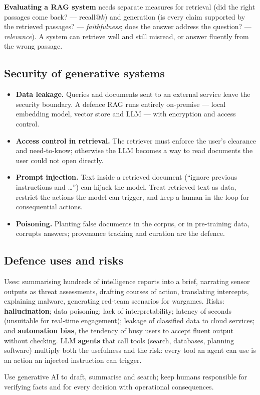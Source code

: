 \documentclass[11pt]{article}
\begin{document}
\textbf{Evaluating a RAG system} needs separate measures for retrieval (did the right passages come back? --- recall@$k$) and generation (is every claim supported by the retrieved passages? --- \emph{faithfulness}; does the answer address the question? --- \emph{relevance}). A system can retrieve well and still misread, or answer fluently from the wrong passage.

\subsection{Security of generative systems}
\begin{itemize}
\item \textbf{Data leakage.} Queries and documents sent to an external service leave the security boundary. A defence RAG runs entirely on-premise --- local embedding model, vector store and LLM --- with encryption and access control.
\item \textbf{Access control in retrieval.} The retriever must enforce the user's clearance and need-to-know; otherwise the LLM becomes a way to read documents the user could not open directly.
\item \textbf{Prompt injection.} Text inside a retrieved document (``ignore previous instructions and \ldots'') can hijack the model. Treat retrieved text as data, restrict the actions the model can trigger, and keep a human in the loop for consequential actions.
\item \textbf{Poisoning.} Planting false documents in the corpus, or in pre-training data, corrupts answers; provenance tracking and curation are the defence.
\end{itemize}

\subsection{Defence uses and risks}
Uses: summarising hundreds of intelligence reports into a brief, narrating sensor outputs as threat assessments, drafting courses of action, translating intercepts, explaining malware, generating red-team scenarios for wargames. Risks: \textbf{hallucination}; data poisoning; lack of interpretability; latency of seconds (unsuitable for real-time engagement); leakage of classified data to cloud services; and \textbf{automation bias}, the tendency of busy users to accept fluent output without checking. LLM \textbf{agents} that call tools (search, databases, planning software) multiply both the usefulness and the risk: every tool an agent can use is an action an injected instruction can trigger.
\begin{keypoint}Use generative AI to draft, summarise and search; keep humans responsible for verifying facts and for every decision with operational consequences.\end{keypoint}
\end{document}
